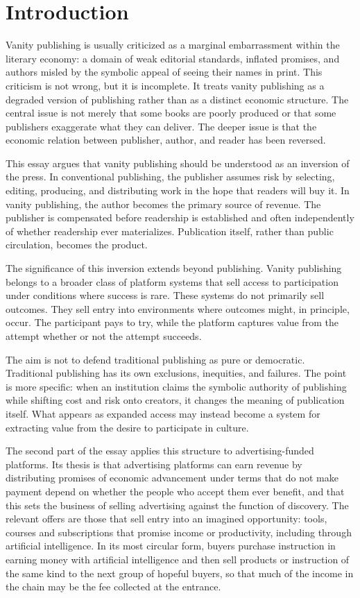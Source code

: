 \documentclass[12pt, a4paper]{article}
\begin{document}
\newpage

\section{Introduction}

Vanity publishing is usually criticized as a marginal embarrassment within the literary economy: a domain of weak editorial standards, inflated promises, and authors misled by the symbolic appeal of seeing their names in print. This criticism is not wrong, but it is incomplete. It treats vanity publishing as a degraded version of publishing rather than as a distinct economic structure. The central issue is not merely that some books are poorly produced or that some publishers exaggerate what they can deliver. The deeper issue is that the economic relation between publisher, author, and reader has been reversed.

This essay argues that vanity publishing should be understood as an inversion of the press. In conventional publishing, the publisher assumes risk by selecting, editing, producing, and distributing work in the hope that readers will buy it. In vanity publishing, the author becomes the primary source of revenue. The publisher is compensated before readership is established and often independently of whether readership ever materializes. Publication itself, rather than public circulation, becomes the product.

The significance of this inversion extends beyond publishing. Vanity publishing belongs to a broader class of platform systems that sell access to participation under conditions where success is rare. These systems do not primarily sell outcomes. They sell entry into environments where outcomes might, in principle, occur. The participant pays to try, while the platform captures value from the attempt whether or not the attempt succeeds.

The aim is not to defend traditional publishing as pure or democratic. Traditional publishing has its own exclusions, inequities, and failures. The point is more specific: when an institution claims the symbolic authority of publishing while shifting cost and risk onto creators, it changes the meaning of publication itself. What appears as expanded access may instead become a system for extracting value from the desire to participate in culture.


The second part of the essay applies this structure to advertising-funded platforms. Its thesis is that advertising platforms can earn revenue by distributing promises of economic advancement under terms that do not make payment depend on whether the people who accept them ever benefit, and that this sets the business of selling advertising against the function of discovery. The relevant offers are those that sell entry into an imagined opportunity: tools, courses and subscriptions that promise income or productivity, including through artificial intelligence. In its most circular form, buyers purchase instruction in earning money with artificial intelligence and then sell products or instruction of the same kind to the next group of hopeful buyers, so that much of the income in the chain may be the fee collected at the entrance.
\end{document}
